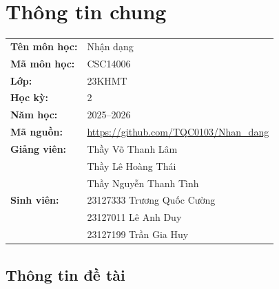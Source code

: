 ﻿\chapter*{Thông tin chung}

\noindent
\begin{tabular}{@{}l l@{}}
  \textbf{Tên môn học:} & Nhận dạng \\
  \textbf{Mã môn học:} & CSC14006 \\
  \textbf{Lớp:} & 23KHMT \\
  \textbf{Học kỳ:} & 2 \\
  \textbf{Năm học:} & 2025--2026 \\
  \textbf{Mã nguồn:} & \url{https://github.com/TQC0103/Nhan_dang} \\[4pt]
  \textbf{Giảng viên:} & Thầy Võ Thanh Lâm \\
  & Thầy Lê Hoàng Thái \\
  & Thầy Nguyễn Thanh Tình \\[6pt]
  \textbf{Sinh viên:} & 23127333 Trương Quốc Cường \\
  & 23127011 Lê Anh Duy \\
  & 23127199 Trần Gia Huy \\
\end{tabular}

\section*{Thông tin đề tài}
{}

